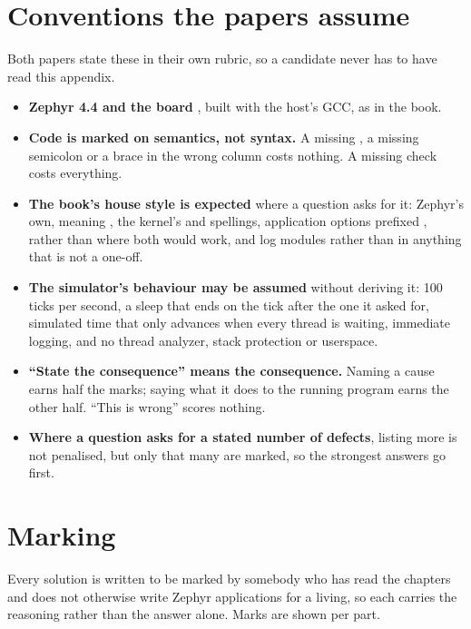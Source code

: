 \section*{Conventions the papers assume}
Both papers state these in their own rubric, so a candidate never has to have read this appendix.
\begin{itemize}
  \item \textbf{Zephyr 4.4 and the board }, built with the host's GCC, as
    in the book.
  \item \textbf{Code is marked on semantics, not syntax.} A missing , a missing
    semicolon or a brace in the wrong column costs nothing. A missing  check
    costs everything.
  \item \textbf{The book's house style is expected} where a question asks for it: Zephyr's own,
    meaning , the kernel's  and  spellings, application options
    prefixed ,  rather than  where both would work, and
    log modules rather than  in anything that is not a one-off.
  \item \textbf{The simulator's behaviour may be assumed} without deriving it: 100 ticks per second,
    a sleep that ends on the tick after the one it asked for, simulated time that only advances when
    every thread is waiting, immediate logging, and no thread analyzer, stack protection or
    userspace.
  \item \textbf{``State the consequence'' means the consequence.} Naming a cause earns half the
    marks; saying what it does to the running program earns the other half. ``This is wrong'' scores
    nothing.
  \item \textbf{Where a question asks for a stated number of defects}, listing more is not
    penalised, but only that many are marked, so the strongest answers go first.
\end{itemize}

\section*{Marking}
Every solution is written to be marked by somebody who has read the chapters and does not otherwise
write Zephyr applications for a living, so each carries the reasoning rather than the answer alone.
Marks are shown per part.

